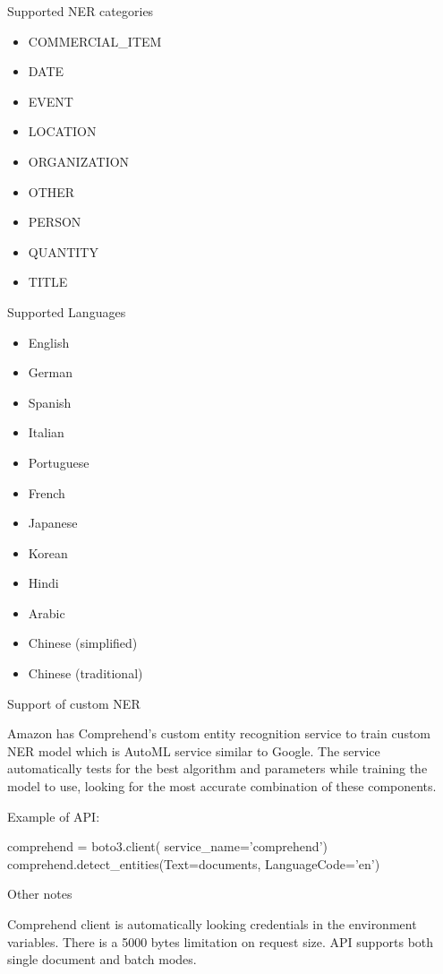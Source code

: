 \documentclass[conference]{IEEEtran}
\begin{document}
Supported NER categories

\begin{itemize}
	\item COMMERCIAL\_ITEM
	\item DATE
	\item EVENT
	\item LOCATION
	\item ORGANIZATION
	\item OTHER
	\item PERSON
	\item QUANTITY
	\item TITLE
\end{itemize}

Supported Languages

\begin{itemize}
	\item English
	\item German
	\item Spanish
	\item Italian
	\item Portuguese
	\item French
	\item Japanese
	\item Korean
	\item Hindi
	\item Arabic
	\item Chinese (simplified)
	\item Chinese (traditional)
\end{itemize}

Support of custom NER

Amazon has Comprehend's custom entity recognition service to train custom NER model which is AutoML service similar to Google. The service automatically tests for the best algorithm and parameters while training the model to use, looking for the most accurate combination of these components.

Example of API:

\begin{verbatimtab}[4]
comprehend = boto3.client(
	service_name='comprehend')
comprehend.detect_entities(Text=documents, 
	LanguageCode='en')
\end{verbatimtab}

Other notes

Comprehend client is automatically looking credentials  in the environment variables. There is a 5000 bytes limitation on request size.  API supports both single document and batch modes.
\end{document}
